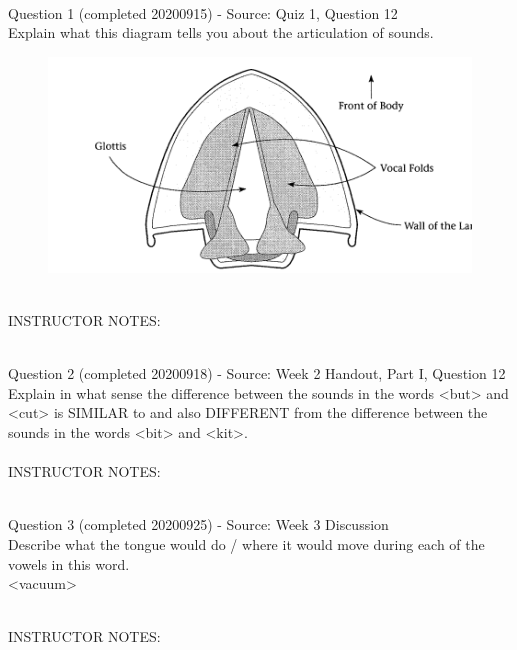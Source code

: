 \documentclass[12pt]{article}
\begin{document}
~\\

{\large Question 1} (completed 20200915) - Source: Quiz 1, Question 12\\

Explain what this diagram tells you about the articulation of sounds.\\

\begin{figure}[H]
\includegraphics{../images/spreadglottis_diagram.png}
\end{figure}

~\\
INSTRUCTOR NOTES: 


~\\

{\large Question 2} (completed 20200918) - Source: Week 2 Handout, Part I, Question 12\\

Explain in what sense the difference between the sounds in the words <but> and <cut> is SIMILAR to and also DIFFERENT from the difference between the sounds in the words <bit> and <kit>.\\


~\\
INSTRUCTOR NOTES: 


~\\

{\large Question 3} (completed 20200925) - Source: Week 3 Discussion\\

Describe what the tongue would do / where it would move during each of the vowels in this word.\\

<vacuum>


~\\
INSTRUCTOR NOTES: 


~\\
\end{document}

